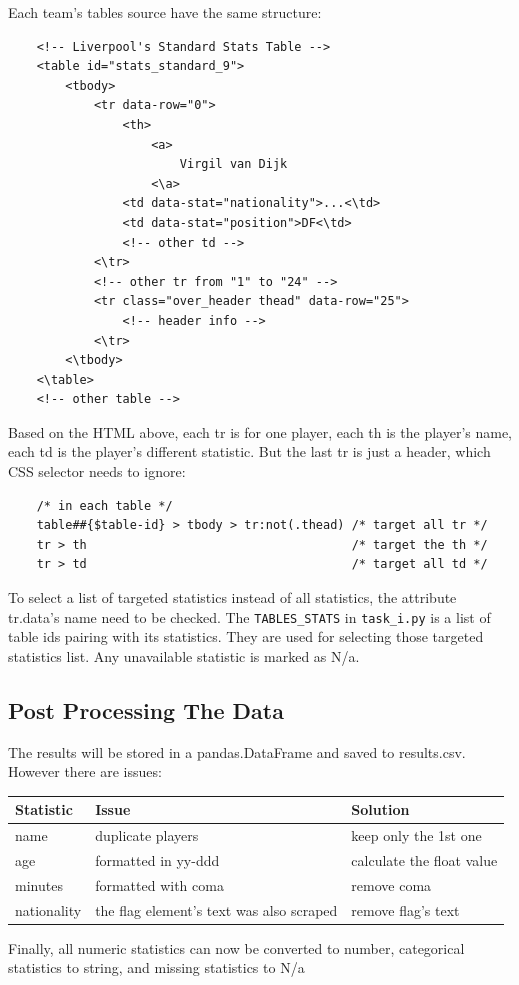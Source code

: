\documentclass{report}
\begin{document}
\noindent
Each team's tables source have the same structure:
\begin{verbatim}
    <!-- Liverpool's Standard Stats Table -->
    <table id="stats_standard_9">
        <tbody>
            <tr data-row="0">
                <th>
                    <a>
                        Virgil van Dijk
                    <\a>
                <td data-stat="nationality">...<\td>
                <td data-stat="position">DF<\td>
                <!-- other td -->
            <\tr>
            <!-- other tr from "1" to "24" -->
            <tr class="over_header thead" data-row="25">
                <!-- header info -->
            <\tr>
        <\tbody>
    <\table>
    <!-- other table -->
\end{verbatim}

\noindent
Based on the HTML above, each tr is for one player, each th is the player's name, each td is the 
player's different statistic. But the last tr is just a header, which CSS selector needs to ignore:
\begin{verbatim}
    /* in each table */
    table##{$table-id} > tbody > tr:not(.thead) /* target all tr */ 
    tr > th                                     /* target the th */
    tr > td                                     /* target all td */
\end{verbatim}

\noindent
To select a list of targeted statistics instead of all statistics, the attribute tr.data's 
name need to be checked. The \verb|TABLES_STATS| in \verb|task_i.py| is a list of 
table ids pairing with its statistics. They are used for selecting those targeted statistics list. 
Any unavailable statistic is marked as N/a.

\subsection{Post Processing The Data}
The results will be stored in a pandas.DataFrame and saved to results.csv. However there are issues:
\begin{center}
\centering
    \begin{tabular}{|l|l|l|}
    \hline
    Statistic & Issue & Solution \\
    \hline
    name & duplicate players & keep only the 1st one \\
    \hline
    age & formatted in yy-ddd & calculate the float value \\
    \hline
    minutes & formatted with coma & remove coma \\
    \hline
    nationality & the flag element's text was also scraped & remove flag's text \\
    \hline
    \end{tabular}
\end{center}
Finally, all numeric statistics can now be converted to number, categorical statistics to string, and
missing statistics to N/a
\end{document}
